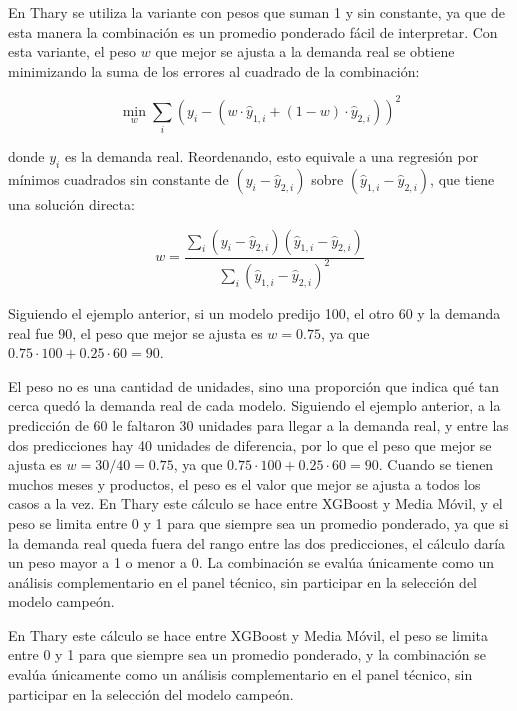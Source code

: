     En Thary se utiliza la variante con pesos que suman 1 y sin constante, ya que de esta manera la combinación es un promedio ponderado fácil de interpretar. Con esta variante, el peso $w$ que mejor se ajusta a la demanda real se obtiene minimizando la suma de los errores al cuadrado de la combinación:

    \begin{equation}
    \min_{w} \sum_{i} \left( y_i - \left( w \cdot \hat{y}_{1,i} + (1 - w) \cdot \hat{y}_{2,i} \right) \right)^2
    \end{equation}

    donde $y_i$ es la demanda real. Reordenando, esto equivale a una regresión por mínimos cuadrados sin constante de $(y_i - \hat{y}_{2,i})$ sobre $(\hat{y}_{1,i} - \hat{y}_{2,i})$, que tiene una solución directa:

    \begin{equation}
    w = \frac{\sum_{i} (y_i - \hat{y}_{2,i})(\hat{y}_{1,i} - \hat{y}_{2,i})}{\sum_{i} (\hat{y}_{1,i} - \hat{y}_{2,i})^2}
    \end{equation}

    Siguiendo el ejemplo anterior, si un modelo predijo 100, el otro 60 y la demanda real fue 90, el peso que mejor se ajusta es $w = 0.75$, ya que $0.75 \cdot 100 + 0.25 \cdot 60 = 90$. 
    
    El peso no es una cantidad de unidades, sino una proporción que indica qué tan cerca quedó la demanda real de cada modelo. Siguiendo el ejemplo anterior, a la predicción de 60 le faltaron 30 unidades para llegar a la demanda real, y entre las dos predicciones hay 40 unidades de diferencia, por lo que el peso que mejor se ajusta es $w = 30/40 = 0.75$, ya que $0.75 \cdot 100 + 0.25 \cdot 60 = 90$. Cuando se tienen muchos meses y productos, el peso es el valor que mejor se ajusta a todos los casos a la vez. En Thary este cálculo se hace entre XGBoost y Media Móvil, y el peso se limita entre 0 y 1 para que siempre sea un promedio ponderado, ya que si la demanda real queda fuera del rango entre las dos predicciones, el cálculo daría un peso mayor a 1 o menor a 0. La combinación se evalúa únicamente como un análisis complementario en el panel técnico, sin participar en la selección del modelo campeón.

    En Thary este cálculo se hace entre XGBoost y Media Móvil, el peso se limita entre 0 y 1 para que siempre sea un promedio ponderado, y la combinación se evalúa únicamente como un análisis complementario en el panel técnico, sin participar en la selección del modelo campeón.


